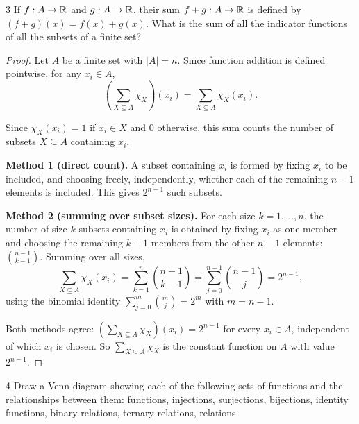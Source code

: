\begin{exercise}{3}
    If $f:A\to\mathbb{R}$ and $g:A\to\mathbb{R}$, their sum $f+g:A\to\mathbb{R}$ is defined by
    $(f+g)(x)=f(x)+g(x)$. What is the sum of all the indicator functions of all
    the subsets of a finite set?
\end{exercise}
\begin{solbox}
\begin{proof}
    Let $A$ be a finite set with $|A|=n$. Since function addition is
    defined pointwise, for any $x_i\in A$,
    \[
        \left(\sum_{X\subseteq A}\chi_X\right)(x_i)
        = \sum_{X\subseteq A}\chi_X(x_i).
    \]

    Since $\chi_X(x_i)=1$ if $x_i\in X$ and $0$ otherwise, this sum
    counts the number of subsets $X\subseteq A$ containing $x_i$.

    \textbf{Method 1 (direct count).} A subset containing $x_i$ is
    formed by fixing $x_i$ to be included, and choosing freely,
    independently, whether each of the remaining $n-1$ elements is
    included. This gives $2^{n-1}$ such subsets.

    \textbf{Method 2 (summing over subset sizes).} For each size
    $k=1,\dots,n$, the number of size-$k$ subsets containing $x_i$ is
    obtained by fixing $x_i$ as one member and choosing the
    remaining $k-1$ members from the other $n-1$ elements:
    $\binom{n-1}{k-1}$. Summing over all sizes,
    \[
        \sum_{X\subseteq A}\chi_X(x_i)
        = \sum_{k=1}^{n}\binom{n-1}{k-1}
        = \sum_{j=0}^{n-1}\binom{n-1}{j} = 2^{n-1},
    \]
    using the binomial identity $\sum_{j=0}^{m}\binom{m}{j}=2^m$
    with $m=n-1$.

    Both methods agree: $\left(\sum_{X\subseteq A}\chi_X\right)(x_i)
    = 2^{n-1}$ for every $x_i\in A$, independent of which $x_i$ is
    chosen. So $\sum_{X\subseteq A}\chi_X$ is the constant function
    on $A$ with value $2^{n-1}$.
\end{proof}
\end{solbox}

\begin{exercise}{4}
    Draw a Venn diagram showing each of the following sets of functions and the
    relationships between them: functions, injections, surjections, bijections,
    identity functions, binary relations, ternary relations, relations.
\end{exercise}

